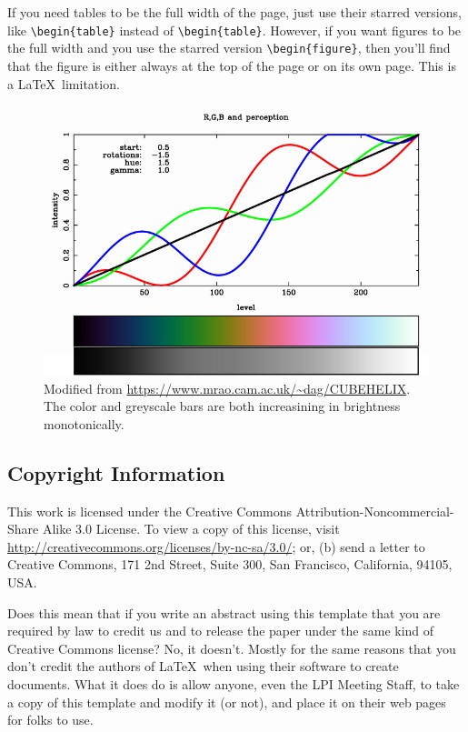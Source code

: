 \documentclass[twoside]{article}
\begin{document}
If you need tables to be the full width of the page,
just use their starred versions, like \verb=\begin{table}= instead
of \verb=\begin{table}=. However, if you want figures to be the full width and you use the starred
version \verb=\begin{figure}=, then you'll find that the figure is either always at the top of the
page or on its own page. This is a \LaTeX\ limitation.

\begin{figure}
\begin{center}
\includegraphics[width=\textwidth]{rgb-grey-morehue.png}
\caption[CubeHelix Color Schemes]{
   \label{SaturationColors}
    Modified from \url{https://www.mrao.cam.ac.uk/~dag/CUBEHELIX}. The color and greyscale bars are both increasining in brightness monotonically.
    }
\end{center}
\end{figure}

\subsection*{Copyright Information}

This work is licensed under the Creative Commons
Attribution-Noncommercial-Share Alike 3.0 License. To view a copy
of this license, visit \url{http://creativecommons.org/licenses/by-nc-sa/3.0/};
or, (b) send a letter to Creative Commons, 171 2nd Street, Suite
300, San Francisco, California, 94105, USA.

Does this mean that if you write an abstract using this template that
you are required by law to credit us and to release the paper under
the same kind of Creative Commons license?  No, it doesn't.  Mostly
for the same reasons that you don't credit the authors of \LaTeX\
when using their software to create documents.  What it does do is allow
anyone, even the LPI Meeting Staff, to take a copy of this template
and modify it (or not), and place it on their web pages for folks
to use.
\end{document}
